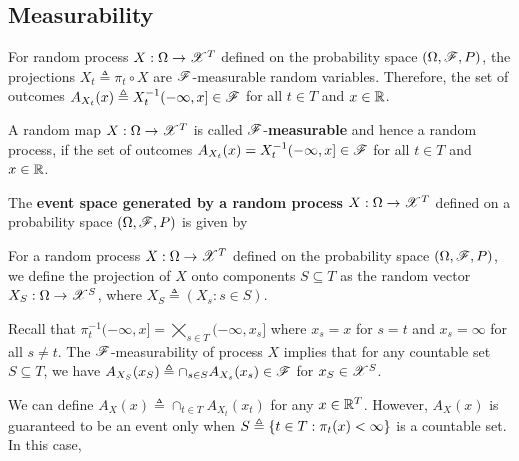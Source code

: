 \documentclass[letterpaper,10pt,english]{article}
\begin{document}
\subsection{Measurability}
For random process $X:\Omega\to \mathscr{X}^T$ defined on the probability space $(\Omega, \mathscr{F}, P)$, 
the projections $X_t \triangleq \pi_t\circ X$ are $\mathscr{F}$-measurable random variables. 
Therefore, the set of outcomes $A_{X_t}(x) \triangleq X_t^{-1}(-\infty, x] \in \mathscr{F}$ for all $t \in T$ and $x \in \mathbb{R}$.  
\begin{defn} 
A random map $X:\Omega\to\mathscr{X}^T$ is called $\mathscr{F}$-\textbf{measurable} and hence a random process,  
if the set of outcomes $A_{X_t}(x) = X_t^{-1}(-\infty, x]\in \mathscr{F}$ for all $t \in T$ and $x\in \mathbb{R}$. 
\end{defn} 
\begin{defn}
The \textbf{event space generated by a random process} $X: \Omega\to\mathscr{X}^T$ defined on a probability space $(\Omega,\mathscr{F},P)$ is given by 
\end{defn}
\begin{defn}
For a random process $X:\Omega \to \mathscr{X}^T$ defined on the probability space $(\Omega,\mathscr{F},P)$,  
we define the projection of $X$ onto components $S \subseteq T$ as the random vector $X_S: \Omega \to \mathscr{X}^S$, where $X_S \triangleq (X_s: s \in S)$.
\end{defn}
\begin{rem}
Recall that $\pi_t^{-1}(-\infty, x] = \bigtimes_{s \in T}(-\infty, x_s]$ where $x_s = x$ for $s = t$ and $x_s = \infty$ for all $s\neq t$. 
The $\mathscr{F}$-measurability of process $X$ implies that for any countable set $S \subseteq T$, 
we have $A_{X_S}(x_S) \triangleq \cap_{s \in S}A_{X_s}(x_s) \in \mathscr{F}$ for $x_S \in \mathscr{X}^S$. 
\end{rem}
\begin{rem}
We can define $A_X(x) \triangleq \cap_{t \in T}A_{X_t}(x_t)$ for any $x \in \mathbb{R}^T$. 
However, $A_X(x)$ is guaranteed to be an event only when $S \triangleq \left\{t \in T: \pi_t(x) < \infty\right\}$ is a countable set. 
In this case, 
\end{rem}
\end{document}
